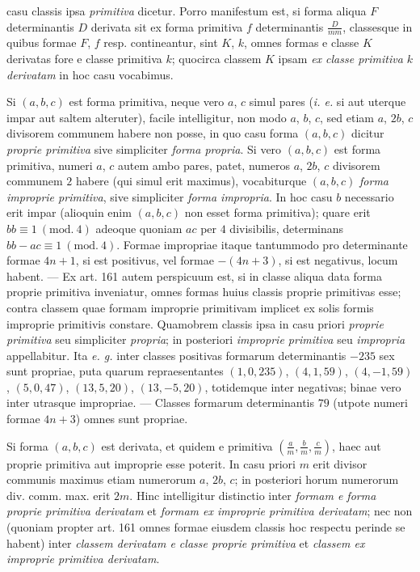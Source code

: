 casu classis ipsa \textit{primitiva} dicetur. Porro manifestum est, si forma aliqua $F$ determinantis $D$ derivata sit ex forma primitiva $f$ determinantis $\frac{D}{mm}$, classesque in quibus formae $F$, $f$ resp. contineantur, sint $K$, $k$, omnes formas e classe $K$ derivatas fore e classe primitiva $k$; quocirca classem $K$ ipsam \textit{ex classe primitiva $k$ derivatam} in hoc casu vocabimus.

Si $(a,b,c)$ est forma primitiva, neque vero $a$, $c$ simul pares (\textit{i. e.} si aut uterque impar aut saltem alteruter), facile intelligitur, non modo $a$, $b$, $c$, sed etiam $a$, $2b$, $c$ divisorem communem habere non posse, in quo casu forma $(a,b,c)$ dicitur \textit{proprie primitiva} sive simpliciter \textit{forma propria}. Si vero $(a,b,c)$ est forma primitiva, numeri $a$, $c$ autem ambo pares, patet, numeros $a$, $2b$, $c$ divisorem communem $2$ habere (qui simul erit maximus), vocabiturque $(a,b,c)$ \textit{forma improprie primitiva}, sive simpliciter \textit{forma impropria}. In hoc casu $b$ necessario erit impar (alioquin enim $(a,b,c)$ non esset forma primitiva); quare erit $bb\equiv1\ (\mathrm{mod.}\ 4)$ adeoque quoniam $ac$ per $4$ divisibilis, determinans $bb-ac\equiv1\ (\mathrm{mod.}\ 4)$. Formae impropriae itaque tantummodo pro determinante formae $4n+1$, si est positivus, vel formae $-(4n+3)$, si est negativus, locum habent. --- Ex art. 161 autem perspicuum est, si in classe aliqua data forma proprie primitiva inveniatur, omnes formas huius classis proprie primitivas esse; contra classem quae formam improprie primitivam implicet ex solis formis improprie primitivis constare. Quamobrem classis ipsa in casu priori \textit{proprie primitiva} seu simpliciter \textit{propria}; in posteriori \textit{improprie primitiva} seu \textit{impropria} appellabitur. Ita \textit{e. g.} inter classes positivas formarum determinantis $-235$ sex sunt propriae, puta quarum repraesentantes $(1,0,235)$, $(4,1,59)$, $(4,-1,59)$, $(5,0,47)$, $(13,5,20)$, $(13,-5,20)$, totidemque inter negativas; binae vero inter utrasque impropriae. --- Classes formarum determinantis $79$ (utpote numeri formae $4n+3$) omnes sunt propriae.

Si forma $(a,b,c)$ est derivata, et quidem e primitiva $\left(\frac{a}{m},\frac{b}{m},\frac{c}{m}\right)$, haec aut proprie primitiva aut improprie esse poterit. In casu priori $m$ erit divisor communis maximus etiam numerorum $a$, $2b$, $c$; in posteriori horum numerorum div. comm. max. erit $2m$. Hinc intelligitur distinctio inter \textit{formam e forma proprie primitiva derivatam} et \textit{formam ex improprie primitiva derivatam}; nec non (quoniam propter art. 161 omnes formae eiusdem classis hoc respectu perinde se habent)
inter \textit{classem derivatam e classe proprie primitiva} et \textit{classem ex improprie primitiva derivatam}.

